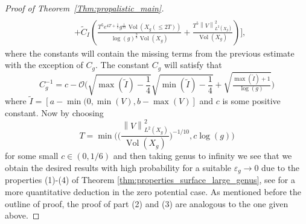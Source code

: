 \documentclass[11pt,twoside,reqno]{amsart}
\newcommand{\eps}{\varepsilon}
\newcommand{\1}{\mathrm{\mathbf{1}}}
\DeclareMathOperator{\Vol}{Vol}
\newcommand{\norm}[1]{\left\lVert#1\right\rVert}
\numberwithin{equation}{section}
\theoremstyle{plain}
\theoremstyle{definition}
\theoremstyle{remark}
\begin{document}
\begin{proof}[Proof of Theorem~\ref{Thm:propalistic_main}]
\begin{equation*}
\begin{aligned}
       \\
       & + \tilde{C}_{I} \left( \frac{ T^5  e^{4T+\frac12} g^{\frac{1}{12}} \Vol(X_g(\leq2T))}{\log(g)^{\frac{9}{8}} \Vol(X_g) } + \frac{T^5\norm{V}_{L^2(X_g)}^2}{\Vol(X_g)} \right)\Bigg],
    \end{aligned}
\end{equation*}
where the constants will contain the missing terms from the previous estimate with the exception of $C_g$. The constant $C_g$ will satisfy that 
\begin{equation*}
    C_g^{-1} =  c- \mathcal{O}\bigg(\sqrt{\max(\tilde{I}) -\frac{1}{4}}\sqrt{\min(\tilde{I})-\frac{1}{4}} +\sqrt{\tfrac{\max(\tilde{I}) +1}{\log(g)}} \bigg)
\end{equation*}
where $\tilde{I} = [a-\min(0,\min(V),b- \max(V)]$ and $c$ is some positive constant. Now by choosing 
\begin{equation*}
    T = \min\Bigg( \bigg(\frac{\norm{V}_{L^2(X_g)}^2}{\Vol(X_g)}\bigg)^{-1/10},  c\log(g) \Bigg)
\end{equation*} 
for some small $c \in (0, 1/6)$ and then taking genus to infinity we see that we obtain the desired results with high probability for a suitable $\eps_g \to 0$ due to the properties (1)-(4) of Theorem \ref{thm:properties_surface_large_genus}, see \cite{lemassonQuantumErgodicityEisenstein2024} for a more quantitative deduction in the zero potential case.  As mentioned before the outline of proof, the proof of part (2) and (3) are analogous to the one given above.
\end{proof}




\end{document}
